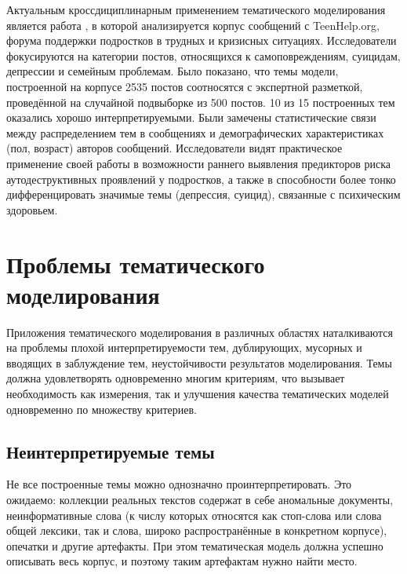 Актуальным кроссдициплинарным применением тематического моделирования является работа \cite{franz2020using}, в которой анализируется корпус сообщений с TeenHelp.org, форума  поддержки подростков в трудных и кризисных ситуациях. Исследователи фокусируются на категории постов, относящихся к самоповреждениям, суицидам, депрессии и семейным проблемам. Было показано, что темы модели, построенной на корпусе 2535 постов соотносятся с экспертной разметкой, проведённой на случайной подвыборке из 500 постов. 10 из 15 построенных тем оказались хорошо интерпретируемыми. Были замечены статистические связи между распределением тем в сообщениях и демографических характеристиках (пол, возраст) авторов сообщений. 
Исследователи видят практическое применение своей работы в возможности раннего выявления предикторов риска аутодеструктивных проявлений у подростков, а также в способности более тонко дифференцировать значимые темы (депрессия, суицид), связанные с психическим здоровьем. 


\section{Проблемы тематического моделирования}

Приложения тематического моделирования в различных областях наталкиваются на проблемы плохой интерпретируемости тем, дублирующих, мусорных и вводящих в заблуждение тем, неустойчивости результатов моделирования. 
Темы должна удовлетворять одновременно многим критериям, что вызывает необходимость как измерения, так и улучшения качества тематических моделей одновременно по множеству критериев. 

\subsection{Неинтерпретируемые темы}

Не все построенные темы можно однозначно проинтерпретировать. Это ожидаемо: коллекции реальных текстов содержат в себе аномальные документы, неинформативные слова (к числу которых относятся как стоп-слова или слова общей лексики, так и слова, широко распространённые в конкретном корпусе), опечатки и другие артефакты. При этом тематическая модель должна успешно описывать весь корпус, и поэтому таким артефактам нужно найти место.

